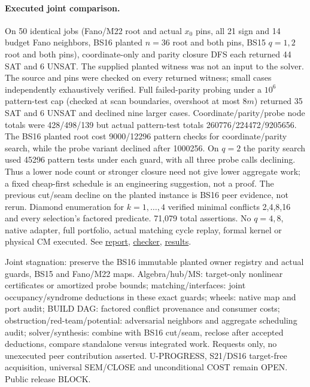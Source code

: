 \documentclass[11pt]{article}
\begin{document}
\paragraph{Executed joint comparison.}
On 50 identical jobs (Fano/M22 root and actual $x_0$ pins, all 21 sign and 14 budget Fano neighbors, BS16 planted $n=36$ root and both pins, BS15 $q=1,2$ root and both pins), coordinate-only and parity closure DFS each returned 44 SAT and 6 UNSAT. The supplied planted witness was not an input to the solver. The source and pins were checked on every returned witness; small cases independently exhaustively verified. Full failed-parity probing under a $10^6$ pattern-test cap (checked at scan boundaries, overshoot at most $8m$) returned 35 SAT and 6 UNSAT and declined nine larger cases. Coordinate/parity/probe node totals were 428/498/139 but actual pattern-test totals 260776/224472/9205656. The BS16 planted root cost 9000/12296 pattern checks for coordinate/parity search, while the probe variant declined after 1000256. On $q=2$ the parity search used 45296 pattern tests under each guard, with all three probe calls declining. Thus a lower node count or stronger closure need not give lower aggregate work; a fixed cheap-first schedule is an engineering suggestion, not a proof. The previous cut/seam decline on the planted instance is BS16 peer evidence, not rerun. Diamond enumeration for $k=1,\ldots,4$ verified minimal conflicts 2,4,8,16 and every selection's factored predicate. 71,079 total assertions. No $q=4,8$, native adapter, full portfolio, actual matching cycle replay, formal kernel or physical CM executed. See \href{https://github.com/j15marti/pnp/commit/e901930852a8e9a1726735544d209ea3346a4bc4}{report}, \href{https://github.com/j15marti/pnp/commit/91482707fb855c52430ebb46ae9df77b398c76b1}{checker}, \href{https://github.com/j15marti/pnp/commit/ccaca24700adc336661e8867460e1ec11241b0e8}{results}.

Joint stagnation: preserve the BS16 immutable planted owner registry and actual guards, BS15 and Fano/M22 maps. Algebra/hub/MS: target-only nonlinear certificates or amortized probe bounds; matching/interfaces: joint occupancy/syndrome deductions in these exact guards; wheels: native map and port audit; BUILD DAG: factored conflict provenance and consumer costs; obstruction/red-team/potential: adversarial neighbors and aggregate scheduling audit; solver/synthesis: combine with BS16 cut/seam, reclose after accepted deductions, compare standalone versus integrated work. Requests only, no unexecuted peer contribution asserted. U-PROGRESS, S21/DS16 target-free acquisition, universal SEM/CLOSE and unconditional COST remain OPEN. Public release BLOCK.
\end{document}
